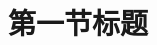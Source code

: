 \documentclass[../../main.tex]{subfiles}%
\begin{document}
\section{第一节标题}

\lipsum[1-3]%
\end{document}
